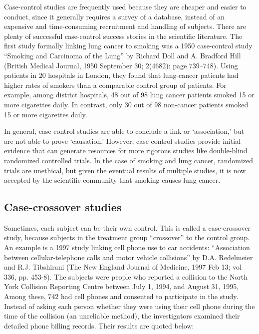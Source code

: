 \documentclass[11pt, chapterprefix=true]{scrbook}\usepackage[]{graphicx}\usepackage[]{color}
\begin{document}
Case-control studies are frequently used because they are cheaper and easier to conduct, since it generally requires a survey of a database, instead of an expensive and time-consuming recruitment and handling of subjects.  There are plenty of successful case-control success stories in the scientific literature.
The first study formally linking lung cancer to smoking was a 1950 case-control study ``Smoking and Carcinoma of the Lung'' by Richard Doll and A. Bradford Hill
(British Medical Journal, 1950 September 30; 2(4682): page 739--748).  Using patients in 20 hospitals in London, they found that lung-cancer patients had higher rates of smokers than a comparable control group of patients.   For example, among district hospitals, 48 out of 98 lung cancer patients smoked 15 or more cigarettes daily.  In contrast, only 30 out of 98 non-cancer patients smoked 15 or more cigarettes daily.

In general, case-control studies are able to conclude a link or `association,' but are not able to prove `causation.'   However, case-control studies provide initial evidence that can generate resources for more rigorous studies like double-blind randomized controlled trials.  In the case of smoking and lung cancer, randomized trials are unethical, but given the eventual results of multiple studies, it is now accepted by the scientific community that smoking causes lung cancer.

\subsection{Case-crossover studies}

Sometimes, each subject can be their own control.  This is called a case-crossover study, because subjects in the treatment group ``crossover'' to the control group.
An example is a 1997 study linking cell phone use to car accidents: ``Association between cellular-telephone calls and motor vehicle collisions'' by D.A. Redelmeier and R.J. Tibshirani (The New England Journal of Medicine, 1997 Feb 13; vol 336, pp. 453-8).  The subjects were people who reported a collision to the North York Collision Reporting Centre between July 1, 1994, and August 31, 1995, Among these, 742 had cell phones and consented to participate in the study.  Instead of asking each person whether they were using their cell phone during the time of the collision (an unreliable method), the investigators examined their detailed phone billing records.  Their results are quoted below:
\end{document}
